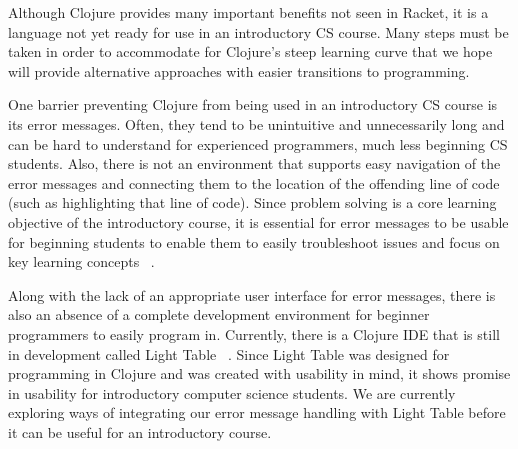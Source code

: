 \documentclass[12pt]{article}
\newcommand{\comment}[1]{}
\newcommand{\emcomment}[1]{\textcolor{ForestGreen}{\comment{Elena: {#1}}}}
\newcommand{\pscomment}[1]{\textcolor{red}{\comment{Paul: {#1}}}}
\newcommand{\mmcomment}[1]{\textcolor{magenta}{\comment{Max: {#1}}}}
\begin{document}
Although Clojure provides many important benefits not seen in Racket, it is a language not yet ready for use in an introductory CS course. Many steps must be taken in order to accommodate for Clojure's steep learning curve that we hope will provide alternative approaches with easier transitions to programming.

One barrier preventing Clojure from being used in an introductory CS course is its error messages. Often, they tend to be unintuitive and unnecessarily long and can be hard to understand for experienced programmers, much less beginning CS students. Also, there is not an environment that supports easy navigation of the error messages and connecting them to the location of the offending line of code (such as highlighting that line of code). Since problem solving is a core learning objective of the introductory course, it is essential for error messages to be usable for beginning students to enable them to easily troubleshoot issues and focus on key learning concepts ~\cite{tfpie2014}.

Along with the lack of an appropriate user interface for error messages, there is also an absence of a complete development environment for beginner programmers to easily program in. %
Currently, there is a Clojure IDE that is still in development called Light Table ~\cite{lightTable}. Since Light Table was designed for programming in Clojure and was created with usability in mind, it shows promise in usability for introductory computer science students. We are currently exploring ways of integrating our error message handling with Light Table before it can be useful for an introductory course.
\end{document}
